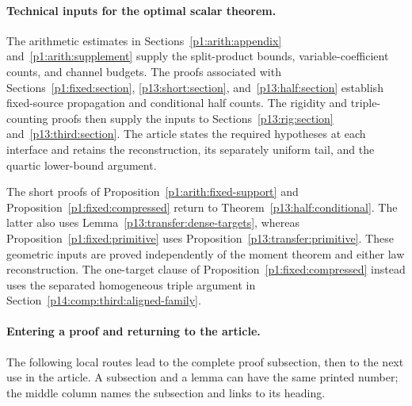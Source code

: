 \paragraph{Technical inputs for the optimal scalar theorem.}
The arithmetic estimates in Sections~\ref{p1:arith:appendix}
and~\ref{p1:arith:supplement} supply the split-product bounds,
variable-coefficient counts, and channel budgets. The proofs
associated with Sections~\ref{p1:fixed:section},
\ref{p13:short:section}, and~\ref{p13:half:section} establish
fixed-source propagation and conditional half counts. The
rigidity and triple-counting proofs then supply the inputs to
Sections~\ref{p13:rig:section} and~\ref{p13:third:section}.
The article states the required hypotheses at each interface
and retains the reconstruction, its separately uniform tail,
and the quartic lower-bound argument.

The short proofs of Proposition~\ref{p1:arith:fixed-support} and
Proposition~\ref{p1:fixed:compressed} return to
Theorem~\ref{p13:half:conditional}. The latter also uses
Lemma~\ref{p13:transfer:dense-targets}, whereas
Proposition~\ref{p1:fixed:primitive} uses
Proposition~\ref{p13:transfer:primitive}. These geometric inputs
are proved independently of the moment theorem and either law reconstruction.
The one-target clause of Proposition~\ref{p1:fixed:compressed} instead
uses the separated homogeneous triple argument in
Section~\ref{p14:comp:third:aligned-family}.

\paragraph{Entering a proof and returning to the article.}
The following local routes lead to the complete proof subsection,
then to the next use in the article. A subsection and a lemma can
have the same printed number; the middle column names the
subsection and links to its heading.


